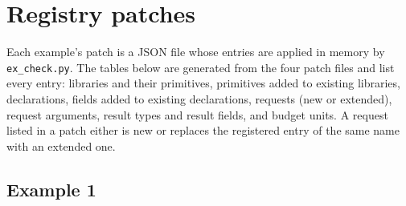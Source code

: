 \documentclass[11pt]{article}
\newcommand{\fpath}[1]{\nolinkurl{#1}}
\theoremstyle{definition}
\theoremstyle{plain}
\begin{document}
\section{Registry patches}\label{app:registry}
Each example's patch is a JSON file whose entries are applied in memory by \fpath{ex_check.py}. The tables below are generated from the four patch files and list every entry: libraries and their primitives, primitives added to existing libraries, declarations, fields added to existing declarations, requests (new or extended), request arguments, result types and result fields, and budget units. A request listed in a patch either is new or replaces the registered entry of the same name with an extended one.
\subsection{Example 1}
\end{document}
